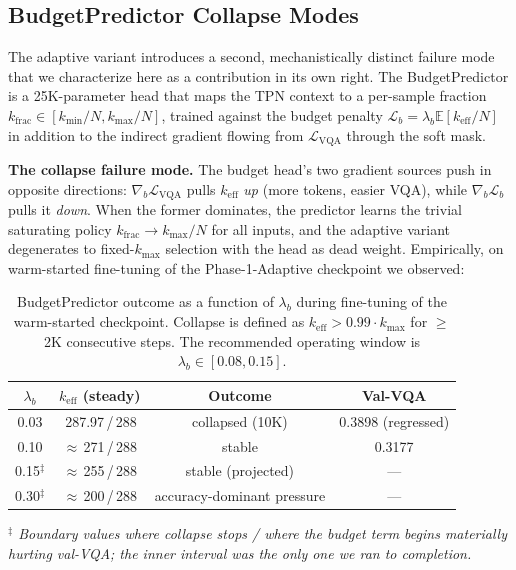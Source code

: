 \documentclass{article}
\begin{document}
\subsection{BudgetPredictor Collapse Modes}
\label{sec:budget-collapse}

The adaptive variant introduces a second, mechanistically distinct
failure mode that we characterize here as a contribution in its own
right. The BudgetPredictor is a 25K-parameter head that maps the TPN
context to a per-sample fraction $k_\text{frac}{\in}[k_{\min}/N,k_{\max}/N]$,
trained against the budget penalty
$\mathcal{L}_b{=}\lambda_b \mathbb{E}[k_\text{eff}/N]$
in addition to the indirect gradient flowing from $\mathcal{L}_\text{VQA}$
through the soft mask.

\textbf{The collapse failure mode.}
The budget head's two gradient sources push in opposite directions:
$\nabla_b \mathcal{L}_\text{VQA}$ pulls $k_\text{eff}$ \emph{up} (more
tokens, easier VQA), while $\nabla_b \mathcal{L}_b$ pulls it
\emph{down}. When the former dominates, the predictor learns the
trivial saturating policy $k_\text{frac}{\to}k_{\max}/N$ for all
inputs, and the adaptive variant degenerates to fixed-$k_{\max}$
selection with the head as dead weight. Empirically, on warm-started
fine-tuning of the Phase-1-Adaptive checkpoint we observed:

\begin{table}[t]
\caption{BudgetPredictor outcome as a function of $\lambda_b$ during
fine-tuning of the warm-started checkpoint. Collapse is defined as
$k_\text{eff} > 0.99 \cdot k_{\max}$ for $\geq$2K consecutive steps.
The recommended operating window is $\lambda_b \in [0.08, 0.15]$.}
\label{tab:budget-collapse}
\vskip 0.1in
\centering
\begin{small}
\begin{tabular}{cccc}
\toprule
$\lambda_b$ & $k_\text{eff}$ (steady) & Outcome & Val-VQA \\
\midrule
0.03 & \,287.97\,/\,288 & collapsed (10K) & 0.3898 (regressed) \\
0.10 & $\approx$\,271\,/\,288 & stable & 0.3177 \\
0.15$^\ddagger$ & $\approx$\,255\,/\,288 & stable (projected) & --- \\
0.30$^\ddagger$ & $\approx$\,200\,/\,288 & accuracy-dominant pressure & --- \\
\bottomrule
\end{tabular}
\end{small}
\vskip -0.04in
\small{\textit{$^\ddagger$ Boundary values where collapse stops /
where the budget term begins materially hurting val-VQA; the inner
interval was the only one we ran to completion.}}
\end{table}
\end{document}
